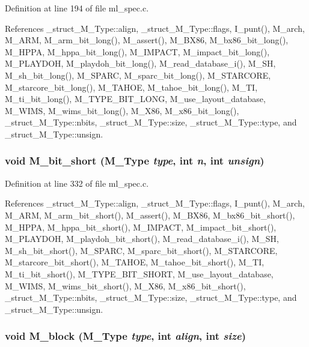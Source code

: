 Definition at line 194 of file ml\_\-spec.c.

References \_\-struct\_\-M\_\-Type::align, \_\-struct\_\-M\_\-Type::flags, I\_\-punt(), M\_\-arch, M\_\-ARM, M\_\-arm\_\-bit\_\-long(), M\_\-assert(), M\_\-BX86, M\_\-bx86\_\-bit\_\-long(), M\_\-HPPA, M\_\-hppa\_\-bit\_\-long(), M\_\-IMPACT, M\_\-impact\_\-bit\_\-long(), M\_\-PLAYDOH, M\_\-playdoh\_\-bit\_\-long(), M\_\-read\_\-database\_\-i(), M\_\-SH, M\_\-sh\_\-bit\_\-long(), M\_\-SPARC, M\_\-sparc\_\-bit\_\-long(), M\_\-STARCORE, M\_\-starcore\_\-bit\_\-long(), M\_\-TAHOE, M\_\-tahoe\_\-bit\_\-long(), M\_\-TI, M\_\-ti\_\-bit\_\-long(), M\_\-TYPE\_\-BIT\_\-LONG, M\_\-use\_\-layout\_\-database, M\_\-WIMS, M\_\-wims\_\-bit\_\-long(), M\_\-X86, M\_\-x86\_\-bit\_\-long(), \_\-struct\_\-M\_\-Type::nbits, \_\-struct\_\-M\_\-Type::size, \_\-struct\_\-M\_\-Type::type, and \_\-struct\_\-M\_\-Type::unsign.
\subsubsection{\setlength{\rightskip}{0pt plus 5cm}void M\_\-bit\_\-short (\bf{M\_\-Type} {\em type}, int {\em n}, int {\em unsign})}\label{ml__spec_8c_df0a8bfa5b3207de53f5f25bf05adc14}




Definition at line 332 of file ml\_\-spec.c.

References \_\-struct\_\-M\_\-Type::align, \_\-struct\_\-M\_\-Type::flags, I\_\-punt(), M\_\-arch, M\_\-ARM, M\_\-arm\_\-bit\_\-short(), M\_\-assert(), M\_\-BX86, M\_\-bx86\_\-bit\_\-short(), M\_\-HPPA, M\_\-hppa\_\-bit\_\-short(), M\_\-IMPACT, M\_\-impact\_\-bit\_\-short(), M\_\-PLAYDOH, M\_\-playdoh\_\-bit\_\-short(), M\_\-read\_\-database\_\-i(), M\_\-SH, M\_\-sh\_\-bit\_\-short(), M\_\-SPARC, M\_\-sparc\_\-bit\_\-short(), M\_\-STARCORE, M\_\-starcore\_\-bit\_\-short(), M\_\-TAHOE, M\_\-tahoe\_\-bit\_\-short(), M\_\-TI, M\_\-ti\_\-bit\_\-short(), M\_\-TYPE\_\-BIT\_\-SHORT, M\_\-use\_\-layout\_\-database, M\_\-WIMS, M\_\-wims\_\-bit\_\-short(), M\_\-X86, M\_\-x86\_\-bit\_\-short(), \_\-struct\_\-M\_\-Type::nbits, \_\-struct\_\-M\_\-Type::size, \_\-struct\_\-M\_\-Type::type, and \_\-struct\_\-M\_\-Type::unsign.
\subsubsection{\setlength{\rightskip}{0pt plus 5cm}void M\_\-block (\bf{M\_\-Type} {\em type}, int {\em align}, int {\em size})}\label{ml__spec_8c_eef80ed5746d648b6eb1d2348b85c8fb}




